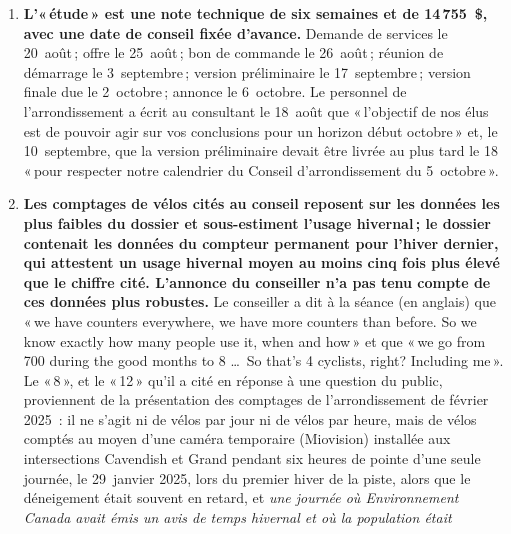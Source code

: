 \documentclass[11pt,letterpaper]{article}
\begin{document}
\begin{enumerate}[nosep]
\begin{minipage}[t]{\linewidth}
    annoncée le 6~octobre est la première étape d'une réduction à l'année de
    l'espace cyclable qui n'a jamais été divulguée au public.\end{minipage}\vspace{0.35em}
\item \begin{minipage}[t]{\linewidth}\textbf{L'«\,étude\,» est une note technique de six semaines et de
    14\,755~\$, avec une date de conseil fixée d'avance.} Demande de
    services le 20~août\,; offre le 25~août\,; bon de commande le 26~août\,;
    réunion de démarrage le 3~septembre\,; version préliminaire le
    17~septembre\,; version finale due le 2~octobre\,; annonce le 6~octobre. Le
    personnel de l'arrondissement a écrit au consultant le 18~août que
    «\,l'objectif de nos élus est de pouvoir agir sur vos conclusions pour un
    horizon début octobre\,» et, le 10~septembre, que la version préliminaire
    devait être livrée au plus tard le 18 «\,pour respecter notre calendrier
    du Conseil d'arrondissement du 5~octobre\,».\end{minipage}\vspace{0.35em}
\item \begin{minipage}[t]{\linewidth}\textbf{Les comptages de vélos cités au conseil reposent sur les
    données les plus faibles du dossier et sous-estiment l'usage
    hivernal\,; le dossier contenait les données du compteur permanent pour
    l'hiver dernier, qui attestent un usage hivernal moyen au moins cinq fois
    plus élevé que le chiffre cité. L'annonce du conseiller n'a pas tenu compte
    de ces données plus robustes.} Le conseiller a dit à la séance (en
    anglais) que «\,we have counters everywhere, we have more counters than
    before. So we know exactly how many people use it, when and how\,» et
    que «\,we go from 700 during the good months to 8 \ldots\ So that's 4
    cyclists, right? Including me\,». Le «\,8\,», et le «\,12\,» qu'il a cité
    en réponse à une question du public, proviennent de la
    présentation des comptages de l'arrondissement de février 2025~: il ne
    s'agit ni de vélos par jour ni de vélos par heure, mais de vélos comptés
    au moyen d'une caméra temporaire (Miovision) installée aux intersections
    Cavendish et Grand pendant six heures de pointe d'une seule journée, le
    29~janvier 2025, lors du premier hiver de la piste, alors que le
    déneigement était souvent en retard, et \emph{une journée où Environnement
    Canada avait émis un avis de temps hivernal et où la population était
}
\end{minipage}
\end{enumerate}
\end{document}
